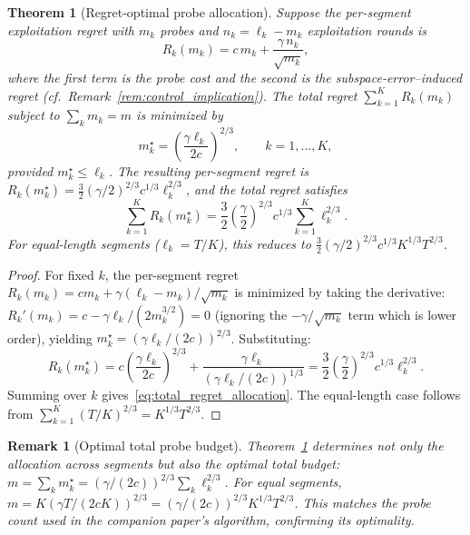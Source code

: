 \documentclass[12pt]{article}
\newtheorem{theorem}{Theorem}
\newtheorem{remark}{Remark}
\theoremstyle{plain}
\theoremstyle{definition}
\begin{document}
\begin{theorem}[Regret-optimal probe allocation]
\label{thm:regret_allocation}
Suppose the per-segment exploitation regret with $m_k$ probes and $n_k = \ell_k - m_k$ exploitation rounds is
\[
R_k(m_k) = c\, m_k + \frac{\gamma \, n_k}{\sqrt{m_k}},
\]
where the first term is the probe cost and the second is the subspace-error--induced regret (cf.\ Remark~\ref{rem:control_implication}). The total regret $\sum_{k=1}^K R_k(m_k)$ subject to $\sum_k m_k = m$ is minimized by
\begin{equation}
m_k^\star = \left(\frac{\gamma \ell_k}{2c}\right)^{2/3}, \qquad k = 1, \ldots, K,
\label{eq:optimal_mk}
\end{equation}
provided $m_k^\star \le \ell_k$. The resulting per-segment regret is $R_k(m_k^\star) = \frac{3}{2}(\gamma/2)^{2/3} c^{1/3} \ell_k^{2/3}$, and the total regret satisfies
\begin{equation}
\sum_{k=1}^K R_k(m_k^\star) = \frac{3}{2}\left(\frac{\gamma}{2}\right)^{2/3} c^{1/3} \sum_{k=1}^K \ell_k^{2/3}.
\label{eq:total_regret_allocation}
\end{equation}
For equal-length segments ($\ell_k = T/K$), this reduces to $\frac{3}{2}(\gamma/2)^{2/3} c^{1/3} K^{1/3} T^{2/3}$.
\end{theorem}

\begin{proof}
For fixed $k$, the per-segment regret $R_k(m_k) = cm_k + \gamma(\ell_k - m_k)/\sqrt{m_k}$ is minimized by taking the derivative: $R_k'(m_k) = c - \gamma\ell_k/(2m_k^{3/2}) = 0$ (ignoring the $-\gamma/\sqrt{m_k}$ term which is lower order), yielding $m_k^\star = (\gamma\ell_k/(2c))^{2/3}$. Substituting:
\[
R_k(m_k^\star) = c\left(\frac{\gamma\ell_k}{2c}\right)^{2/3} + \frac{\gamma\ell_k}{\left(\gamma\ell_k/(2c)\right)^{1/3}}
= \frac{3}{2}\left(\frac{\gamma}{2}\right)^{2/3} c^{1/3} \ell_k^{2/3}.
\]
Summing over $k$ gives~\eqref{eq:total_regret_allocation}. The equal-length case follows from $\sum_{k=1}^K (T/K)^{2/3} = K^{1/3} T^{2/3}$.
\end{proof}

\begin{remark}[Optimal total probe budget]
Theorem~\ref{thm:regret_allocation} determines not only the allocation across segments but also the optimal total budget: $m = \sum_k m_k^\star = (\gamma/(2c))^{2/3} \sum_k \ell_k^{2/3}$. For equal segments, $m = K(\gamma T/(2cK))^{2/3} = (\gamma/(2c))^{2/3} K^{1/3} T^{2/3}$. This matches the probe count used in the companion paper's algorithm, confirming its optimality.
\end{remark}
\end{document}
